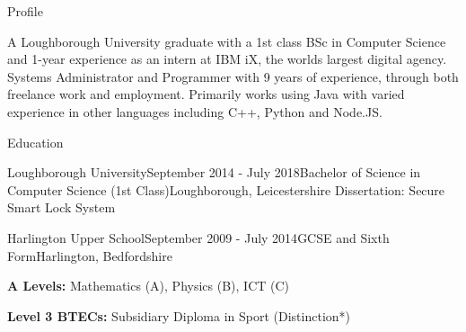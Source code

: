 \documentclass{resume} %
\begin{document}

\begin {rSection}{Profile}

A Loughborough University graduate with a 1st class BSc in Computer Science and 1-year experience as an intern at IBM iX, the worlds largest digital agency. Systems Administrator and Programmer with 9 years of experience, through both freelance work and employment. Primarily works using Java with varied experience in other languages including C++, Python and Node.JS.

\end{rSection}


\begin{rSection}{Education}

\begin{rSubsection}{Loughborough University}{September 2014 - July 2018}{Bachelor of Science in Computer Science (1st Class)}{Loughborough, Leicestershire}
Dissertation: Secure Smart Lock System
\end{rSubsection}

\begin{rSubsection}{Harlington Upper School}{September 2009 - July 2014}{GCSE and Sixth Form}{Harlington, Bedfordshire}
\item \textbf{A Levels: } Mathematics (A), Physics (B), ICT (C)
\item \textbf{Level 3 BTECs: } Subsidiary Diploma in Sport (Distinction*)
\end{rSubsection}
\end{rSection}

\end{document}
